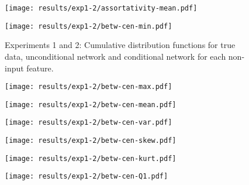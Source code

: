 \begin{figure}[ht]
	
	\begin{minipage}[b]{0.45\linewidth}
		\centering
		\texttt{[image: results/exp1-2/assortativity-mean.pdf]} 
		\label{fig:results-noninput-assortativity-mean}
	\end{minipage}
	\begin{minipage}[b]{0.45\linewidth}
		\centering
		\texttt{[image: results/exp1-2/betw-cen-min.pdf]} 
		\label{fig:results-noninput-betw-cen-min}
	\end{minipage} 
	
	
	\caption[Graphical results for experiments 1 and 2]{Experiments 1 and 2: Cumulative distribution functions for true data, unconditional network and conditional network for each non-input feature.}
\end{figure}\begin{figure}[ht]
	\begin{minipage}[b]{0.45\linewidth}
		\centering
		\texttt{[image: results/exp1-2/betw-cen-max.pdf]} 
		\label{fig:results-noninput-betw-cen-max}
	\end{minipage}
	\begin{minipage}[b]{0.45\linewidth}
		\centering
		\texttt{[image: results/exp1-2/betw-cen-mean.pdf]} 
		\label{fig:results-noninput-betw-cen-mean}
	\end{minipage} 
	
	
	\begin{minipage}[b]{0.45\linewidth}
		\centering
		\texttt{[image: results/exp1-2/betw-cen-var.pdf]} 
		\label{fig:results-noninput-betw-cen-var}
	\end{minipage}
	\begin{minipage}[b]{0.45\linewidth}
		\centering
		\texttt{[image: results/exp1-2/betw-cen-skew.pdf]} 
		\label{fig:results-noninput-betw-cen-skew}
	\end{minipage} 
	
	
	\begin{minipage}[b]{0.45\linewidth}
		\centering
		\texttt{[image: results/exp1-2/betw-cen-kurt.pdf]} 
		\label{fig:results-noninput-betw-cen-kurt}
	\end{minipage}
	\begin{minipage}[b]{0.45\linewidth}
		\centering
		\texttt{[image: results/exp1-2/betw-cen-Q1.pdf]} 
		\label{fig:results-noninput-betw-cen-Q1}
	\end{minipage} 
	

\end{figure}

